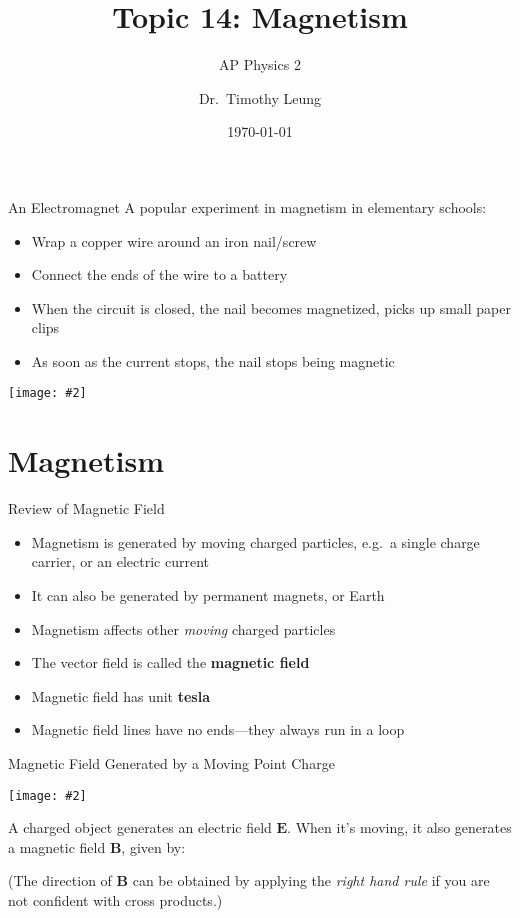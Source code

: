 \documentclass[12pt,aspectratio=169]{beamer}
\title{Topic 14: Magnetism}
\subtitle{AP Physics 2}
\author[TML]{Dr.\ Timothy Leung}
\institute{Olympiads School}
\date{\today}
\newcommand{\pic}[2]{\texttt{[image: \#2]}}
\newcommand{\eq}[2]{\vspace{#1}{\Large\begin{displaymath}#2\end{displaymath}}}
\begin{document}
\begin{frame}
  \maketitle
\end{frame}


\begin{frame}{An Electromagnet}
  A popular experiment in magnetism in elementary schools:
  \begin{itemize}
  \item Wrap a copper wire around an iron nail/screw
  \item Connect the ends of the wire to a battery
  \item When the circuit is closed, the nail becomes magnetized, picks up
    small paper clips
  \item As soon as the current stops, the nail stops being magnetic
  \end{itemize}
  \begin{center}
    \pic{.4}{nail}
  \end{center}
\end{frame}


\section{Magnetism}

\begin{frame}{Review of Magnetic Field}
  \begin{itemize}
  \item Magnetism is generated by moving charged particles, e.g.\ a single
    charge carrier, or an electric current
  \item It can also be generated by permanent magnets, or Earth
  \item Magnetism affects other \emph{moving} charged particles
  \item The vector field is called the \textbf{magnetic field}
  \item Magnetic field has unit \textbf{tesla}
  \item Magnetic field lines have no ends---they always run in a loop
  \end{itemize}
\end{frame}



\begin{frame}{Magnetic Field Generated by a Moving Point Charge}
  \begin{center}
    \pic{.35}{pointchargeB}
  \end{center}
  A charged object generates an electric field $\bm{E}$. When it's moving, it
  also generates a magnetic field $\bm{B}$, given by:

  \eq{-.3in}{
    \boxed{\bm{B}=\frac{\mu_0}{4\pi}\frac{q\bm{v}\times\hat{\bm{r}}}{r^2}}
  }

  \vspace{-.1in}(The direction of $\bm{B}$ can be obtained by applying the
  \emph{right hand rule} if you are not confident with cross products.)
\end{frame}
\end{document}
